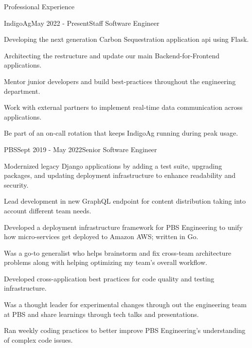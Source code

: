 \documentclass{bluefin_cv}
\begin{document}
\begin{bfcvSection}{Professional Experience}

\begin{bfcvWorkSubsection}{IndigoAg}{May 2022 - Present}{Staff Software Engineer}
\item Developing the next generation Carbon Sequestration application api using Flask.
\item Architecting the restructure and update our main Backend-for-Frontend applications.
\item Mentor junior developers and build best-practices throughout the engineering department.
\item Work with external partners to implement real-time data communication across applications.
\item Be part of an on-call rotation that keeps IndigoAg running during peak usage.
\end{bfcvWorkSubsection}

\begin{bfcvWorkSubsection}{PBS}{Sept 2019 - May 2022}{Senior Software Engineer}
\item Modernized legacy Django applications by adding a test suite, upgrading packages, and updating deployment infrastructure to enhance readability and security.
\item Lead development in new GraphQL endpoint for content distribution taking into account different team needs.
\item Developed a deployment infrastructure framework for PBS Engineering to unify how micro-services get deployed to Amazon AWS; written in Go.
\item Was a go-to generalist who helps brainstorm and fix cross-team architecture problems along with helping optimizing my team's overall workflow.
\item Developed cross-application best practices for code quality and testing infrastructure.
\item Was a thought leader for experimental changes through out the engineering team at PBS and share learnings through tech talks and presentations.
\item Ran weekly coding practices to better improve PBS Engineering's understanding of complex code issues.
\end{bfcvWorkSubsection}


\end{bfcvSection}
\end{document}
